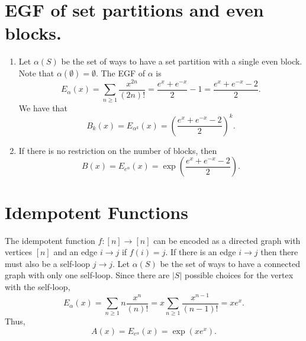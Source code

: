 \documentclass{article}
\begin{document}
\section{EGF of set partitions and even blocks.}
   \begin{enumerate}
      \item Let $\alpha(S)$ be the set of ways to have a set partition 
         with a single even block.
         Note that $\alpha(\emptyset) = \emptyset$.
         The EGF of $\alpha$ is 
         \[
            E_\alpha(x)
            = \sum_{n \geq 1} \frac{x^{2n}}{(2n)!}
            = \frac{e^x + e^{-x}}{2} - 1
            = \frac{e^x + e^{-x}-2}{2}.
         \]
         We have that
         \[
            B_k(x)
            = E_{\alpha^k}(x)
            = \left(\frac{e^x + e^{-x}-2}{2}\right)^k.
         \]
      \item If there is no restriction on the number of blocks, then
         \[
            B(x) 
            = E_{e^\alpha}(x)
            = \exp\left(\frac{e^x + e^{-x}-2}{2}\right).
         \]
   \end{enumerate}
   \newpage 
\section{Idempotent Functions }
   The idempotent function $f:[n] \to [n]$ can be encoded as a directed graph 
   with vertices $[n]$ and an edge $i \to j$ if $f(i) = j$.
   If there is an edge $i \to j$ then there must also be a self-loop $j \to j$.
   Let $\alpha(S)$ be the set of ways to have a 
   connected graph with only one self-loop.
   Since there are $|S|$ possible choices for the vertex with the self-loop,
   \[
      E_\alpha(x)
      = \sum_{n \geq 1} n\frac{x^{n}}{(n)!}
      = x\sum_{n \geq 1} \frac{x^{n-1}}{(n-1)!}
      = xe^x.
   \]
   Thus, 
   \[
      A(x) 
      = E_{e^\alpha}(x)
      = \exp(xe^x).
   \]
\end{document}
